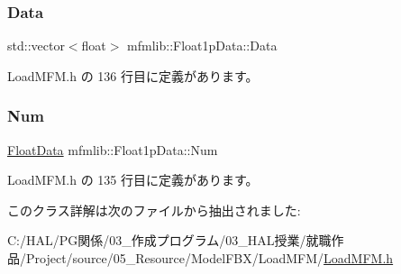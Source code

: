 \subsubsection{\texorpdfstring{Data}{Data}}
{\footnotesize\ttfamily std\+::vector$<$float$>$ mfmlib\+::\+Float1p\+Data\+::\+Data}



 Load\+M\+F\+M.\+h の 136 行目に定義があります。

\mbox{\label{classmfmlib_1_1_float1p_data_a6672d2c3f3e05965772b92524f27db15}} 
\subsubsection{\texorpdfstring{Num}{Num}}
{\footnotesize\ttfamily \mbox{\hyperlink{classmfmlib_1_1_float_data}{Float\+Data}} mfmlib\+::\+Float1p\+Data\+::\+Num}



 Load\+M\+F\+M.\+h の 135 行目に定義があります。



このクラス詳解は次のファイルから抽出されました\+:\begin{DoxyCompactItemize}
\item 
C\+:/\+H\+A\+L/\+P\+G関係/03\+\_\+作成プログラム/03\+\_\+\+H\+A\+L授業/就職作品/\+Project/source/05\+\_\+\+Resource/\+Model\+F\+B\+X/\+Load\+M\+F\+M/\mbox{\hyperlink{_load_m_f_m_8h}{Load\+M\+F\+M.\+h}}\end{DoxyCompactItemize}
